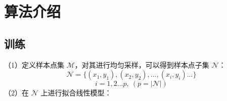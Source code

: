 \documentclass{seuer}
\begin{document}



\wuhao 
\section{算法介绍}
\subsection{训练}
（1）定义样本点集 $\mathcal{M}$，对其进行均匀采样，可以得到样本点子集 $\mathcal{N}$：
\begin{equation}\label{EQ1}
\mathcal{N} = \{(x_1, y_1), (x_2, y_2), ..., (x_i, y_i) ...\}
\end{equation}
\begin{equation}\label{EQ1}
   i=1 , 2...p,\ (p=|\mathcal{N}|)
\end{equation}
（2）在 $\mathcal{N}$ 上进行拟合线性模型：
\end{document}
